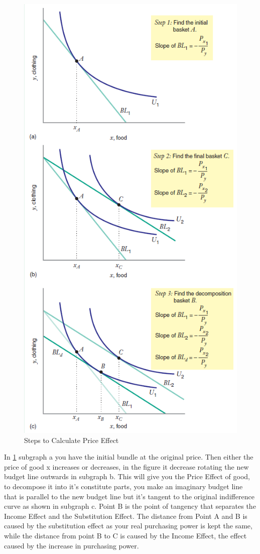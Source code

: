 \documentclass[../ECON-281-Notes.tex]{subfiles}
\begin{document}
\begin{figure}[t]
    \centering
    \includegraphics[width=0.8\columnwidth]{../assets/PE-steps.png}
    \caption{Steps to Calculate Price Effect}
    \label{fig:calc_price_effect}
\end{figure}

In \cref{fig:calc_price_effect} subgraph a you have the initial bundle at the original price. Then either the price of good x increases or decreases, in the figure it decrease rotating the new budget line outwards in subgraph b. This will give you the Price Effect of good, to decompose it into it's constitute parts, you make an imaginary budget line that is parallel to the new budget line but it's tangent to the original indifference curve as shown in subgraph c. Point B is the point of tangency that separates the Income Effect and the Substitution Effect. The distance from Point A and B is caused by the substitution effect as your real purchasing power is kept the same, while the distance from point B to C is caused by the Income Effect, the effect caused by the increase in purchasing power. 
\end{document}

